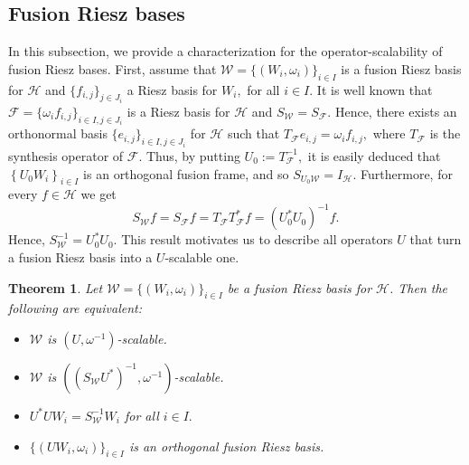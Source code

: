 \documentclass[sn-mathphys-num]{sn-jnl}%
\newtheorem{theorem}{Theorem}[section]
\theoremstyle{definition}
\theoremstyle{remark}
\numberwithin{equation}{section}
\begin{document}
\subsection{Fusion Riesz bases}
In this subsection, we provide a characterization for the operator-scalability of fusion Riesz bases. First, assume that $\mathcal{W}=\{(W_{i},\omega_{i})\}_{i \in I}$ is a fusion Riesz basis for $\mathcal {H}$ and $\{f_{i,j}\}_{j \in J_{i}}$ a Riesz basis for $W_{i},$ for all $i \in I.$ It is well known that $\mathcal {F}=\{\omega_{i}f_{i,j}\}_{i \in I,j \in J_{i}}$ is a Riesz basis for $\mathcal {H}$ and $S_{\mathcal{W}}=S_{\mathcal{F}}.$ Hence, there exists an orthonormal basis $\{e_{i,j}\}_{i \in I,j \in J_{i}}$ for $\mathcal {H}$ such that $T_{\mathcal{F}}e_{i,j}=\omega_{i}f_{i,j},$ where $T_{\mathcal{F}}$ is the synthesis operator of $\mathcal{F}$. Thus, by putting $U_{0}:=T_{\mathcal{F}}^{-1},$ it is easily deduced that $\left\lbrace U_{0}W_{i}\right\rbrace _{i \in I}$ is an orthogonal fusion frame, and so $S_{U_{0}\mathcal{W}}=I_{\mathcal {H}}.$ 
Furthermore, for every $f \in \mathcal {H}$ we get
\begin{equation*}
S_{\mathcal{W}}f=S_{\mathcal{F}}f=T_{\mathcal{F}}T_{\mathcal{F}}^{*}f=\left( U_{0}^{*}U_{0}\right) ^{-1}f.
\end{equation*}
Hence, $S_{\mathcal{W}}^{-1}=U_{0}^*U_{0}.$ This result motivates us to describe all operators $U$ that turn a fusion Riesz basis into a $U$-scalable one.


\begin{theorem}\label{in case Riesz}
Let $\mathcal{W}=\{(W_{i},\omega_{i})\}_{i \in I} $ be a fusion Riesz basis for $\mathcal {H}$. Then the following are equivalent:
\begin{itemize}
\item[$(i)$] $\mathcal{W}$ is $\left( U,\omega^{-1}\right) $-scalable.
\item[$(ii)$] $\mathcal{W}$ is $\left( \left( S_{\mathcal{W}}U^*\right) ^{-1},\omega^{-1}\right) $-scalable.
\item[$(iii)$] $U^*UW_{i}=S_{\mathcal{W}}^{-1}W_{i}$ for all $ i \in I.$   
\item[$(iv)$] $\{(UW_{i},\omega_{i})\}_{i \in I} $ is an orthogonal fusion Riesz basis.
\end{itemize}
\end{theorem}
\end{document}
